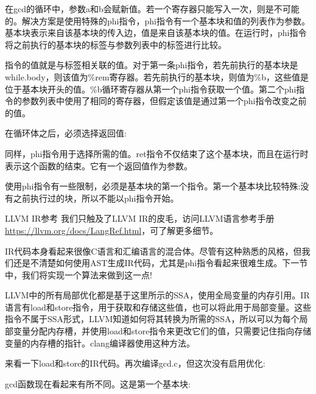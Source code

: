 在gcd的循环中，参数a和b会赋新值。若一个寄存器只能写入一次，则是不可能的。解决方案是使用特殊的phi指令，phi指令有一个基本块和值的列表作为参数。基本块表示来自该基本块的传入边，值是来自该基本块的值。在运行时，phi指令将之前执行的基本块的标签与参数列表中的标签进行比较。

指令的值就是与标签相关联的值。对于第一条phi指令，若先前执行的基本块是while.body，则该值为\%rem寄存器。若先前执行的基本块，则值为\%b，这些值是位于基本块开头的值。\%b循环寄存器从第一个phi指令获取一个值。第二个phi指令的参数列表中使用了相同的寄存器，但假定该值是通过第一个phi指令改变之前的值。

在循环体之后，必须选择返回值:

\begin{shell}
return:
                      [ %
    ret i32 %
}
\end{shell}

同样，phi指令用于选择所需的值。ret指令不仅结束了这个基本块，而且在运行时表示这个函数的结束。它有一个返回值作为参数。

使用phi指令有一些限制，必须是基本块的第一个指令。第一个基本块比较特殊:没有之前执行过的块，所以不能以phi指令开始。

\begin{myTip}{LLVM IR参考}
我们只触及了LLVM IR的皮毛，访问LLVM语言参考手册\url{https://llvm.org/docs/LangRef.html}，可了解更多细节。
\end{myTip}

IR代码本身看起来很像C语言和汇编语言的混合体。尽管有这种熟悉的风格，但我们还是不清楚如何使用AST生成IR代码，尤其是phi指令看起来很难生成。下一节中，我们将实现一个算法来做到这一点!


LLVM中的所有局部优化都是基于这里所示的SSA，使用全局变量的内存引用。IR语言有load和store指令，用于获取和存储这些值，也可以将此用于局部变量。这些指令不属于SSA形式，LLVM知道如何将其转换为所需的SSA，所以可以为每个局部变量分配内存槽，并使用load和store指令来更改它们的值，只需要记住指向存储变量的内存槽的指针。clang编译器使用这种方法。

来看一下load和store的IR代码。再次编译gcd.c，但这次没有启用优化:


gcd函数现在看起来有所不同。这是第一个基本块:


